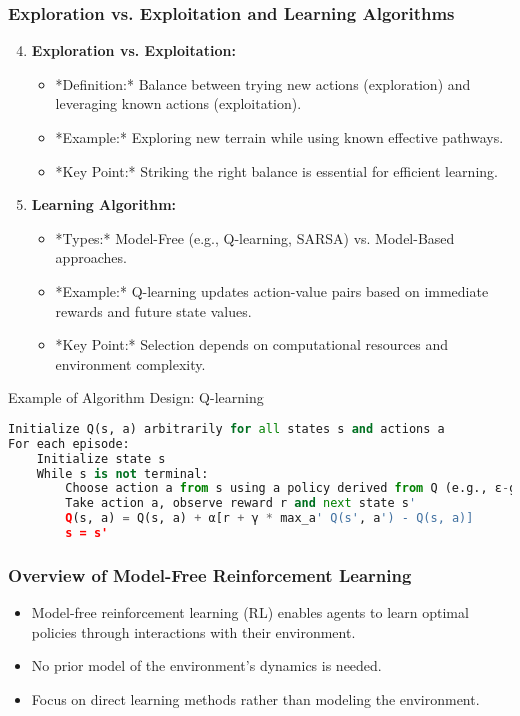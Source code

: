 \documentclass{beamer}
\begin{document}
\begin{frame}[fragile]
    \frametitle{Exploration vs. Exploitation and Learning Algorithms}
    \begin{enumerate}
        \setcounter{enumi}{3}
        \item \textbf{Exploration vs. Exploitation:}
        \begin{itemize}
            \item *Definition:* Balance between trying new actions (exploration) and leveraging known actions (exploitation).
            \item *Example:* Exploring new terrain while using known effective pathways.
            \item *Key Point:* Striking the right balance is essential for efficient learning.
        \end{itemize}

        \item \textbf{Learning Algorithm:}
        \begin{itemize}
            \item *Types:* Model-Free (e.g., Q-learning, SARSA) vs. Model-Based approaches.
            \item *Example:* Q-learning updates action-value pairs based on immediate rewards and future state values.
            \item *Key Point:* Selection depends on computational resources and environment complexity.
        \end{itemize}
    \end{enumerate}

    \begin{block}{Example of Algorithm Design: Q-learning}
        \begin{lstlisting}[language=Python]
Initialize Q(s, a) arbitrarily for all states s and actions a
For each episode:
    Initialize state s
    While s is not terminal:
        Choose action a from s using a policy derived from Q (e.g., ε-greedy)
        Take action a, observe reward r and next state s'
        Q(s, a) = Q(s, a) + α[r + γ * max_a' Q(s', a') - Q(s, a)]
        s = s'
        \end{lstlisting}
    \end{block}
\end{frame}

\begin{frame}[fragile]
    \frametitle{Overview of Model-Free Reinforcement Learning}
    \begin{itemize}
        \item Model-free reinforcement learning (RL) enables agents to learn optimal policies through interactions with their environment.
        \item No prior model of the environment's dynamics is needed.
        \item Focus on direct learning methods rather than modeling the environment.
    \end{itemize}
\end{frame}
\end{document}
